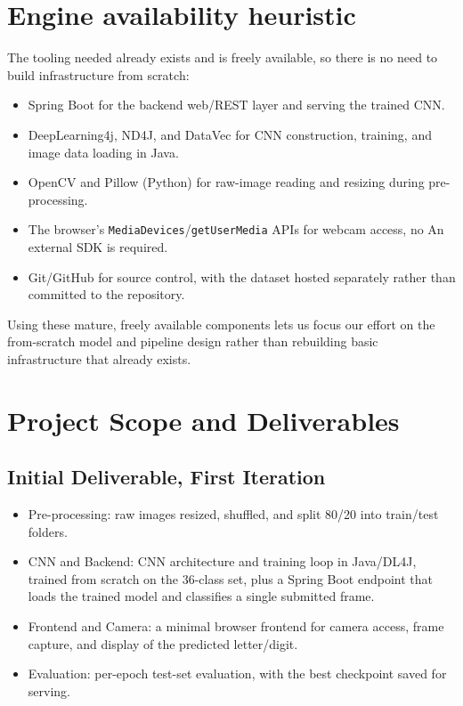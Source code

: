 \documentclass[12pt,a4paper]{article}
\begin{document}
\section{Engine availability heuristic}

The tooling needed already exists and is freely available, so there is no need to build
infrastructure from scratch:

\begin{itemize}[leftmargin=*]

  \item Spring Boot for the backend web/REST layer and serving the trained CNN.

  \item DeepLearning4j, ND4J, and DataVec for CNN construction, training, and image data
  loading in Java.

  \item OpenCV and Pillow (Python) for raw-image reading and resizing during pre-processing.

  \item The browser's \texttt{MediaDevices}/\texttt{getUserMedia} APIs for webcam access, no
  An external SDK is required.

  \item Git/GitHub for source control, with the dataset hosted separately rather than
  committed to the repository.

\end{itemize}

Using these mature, freely available components lets us focus our effort on the from-scratch
model and pipeline design rather than rebuilding basic infrastructure that already exists.


\section{Project Scope and Deliverables}

\subsection{Initial Deliverable, First Iteration}

\begin{itemize}[leftmargin=*]

  \item Pre-processing: raw images resized, shuffled, and split 80/20 into train/test folders.

  \item CNN and Backend: CNN architecture and training loop in Java/DL4J, trained from scratch
  on the 36-class set, plus a Spring Boot endpoint that loads the trained model and classifies
  a single submitted frame.

  \item Frontend and Camera: a minimal browser frontend for camera access, frame capture, and
  display of the predicted letter/digit.

  \item Evaluation: per-epoch test-set evaluation, with the best checkpoint saved for serving.

\end{itemize}
\end{document}
